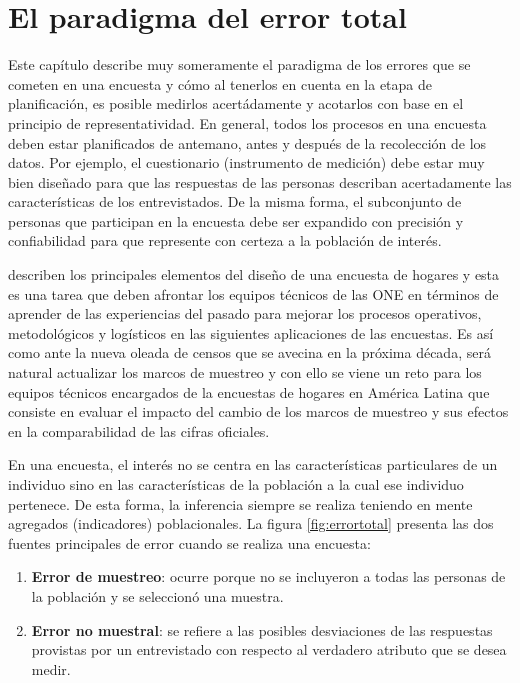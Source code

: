 \documentclass[
  12pt,
]{book}
\providecommand{\tightlist}{%
  \setlength{\itemsep}{0pt}\setlength{\parskip}{0pt}}
\begin{document}
\hypertarget{el-paradigma-del-error-total}{%
\chapter{El paradigma del error total}\label{el-paradigma-del-error-total}}

Este capítulo describe muy someramente el paradigma de los errores que se cometen en una encuesta y cómo al tenerlos en cuenta en la etapa de planificación, es posible medirlos acertádamente y acotarlos con base en el principio de representatividad. En general, todos los procesos en una encuesta deben estar planificados de antemano, antes y después de la recolección de los datos. Por ejemplo, el cuestionario (instrumento de medición) debe estar muy bien diseñado para que las respuestas de las personas describan acertadamente las características de los entrevistados. De la misma forma, el subconjunto de personas que participan en la encuesta debe ser expandido con precisión y confiabilidad para que represente con certeza a la población de interés.

\citet{Beland_Dale_Dufour_Hamel_2005} describen los principales elementos del diseño de una encuesta de hogares y esta es una tarea que deben afrontar los equipos técnicos de las ONE en términos de aprender de las experiencias del pasado para mejorar los procesos operativos, metodológicos y logísticos en las siguientes aplicaciones de las encuestas. Es así como ante la nueva oleada de censos que se avecina en la próxima década, será natural actualizar los marcos de muestreo y con ello se viene un reto para los equipos técnicos encargados de la encuestas de hogares en América Latina que consiste en evaluar el impacto del cambio de los marcos de muestreo y sus efectos en la comparabilidad de las cifras oficiales.

En una encuesta, el interés no se centra en las características particulares de un individuo sino en las características de la población a la cual ese individuo pertenece. De esta forma, la inferencia siempre se realiza teniendo en mente agregados (indicadores) poblacionales. La figura \ref{fig:errortotal} presenta las dos fuentes principales de error cuando se realiza una encuesta:

\begin{enumerate}
\def\labelenumi{\arabic{enumi}.}
\tightlist
\item
  \textbf{Error de muestreo}: ocurre porque no se incluyeron a todas las personas de la población y se seleccionó una muestra.
\item
  \textbf{Error no muestral}: se refiere a las posibles desviaciones de las respuestas provistas por un entrevistado con respecto al verdadero atributo que se desea medir.
\end{enumerate}
\end{document}
